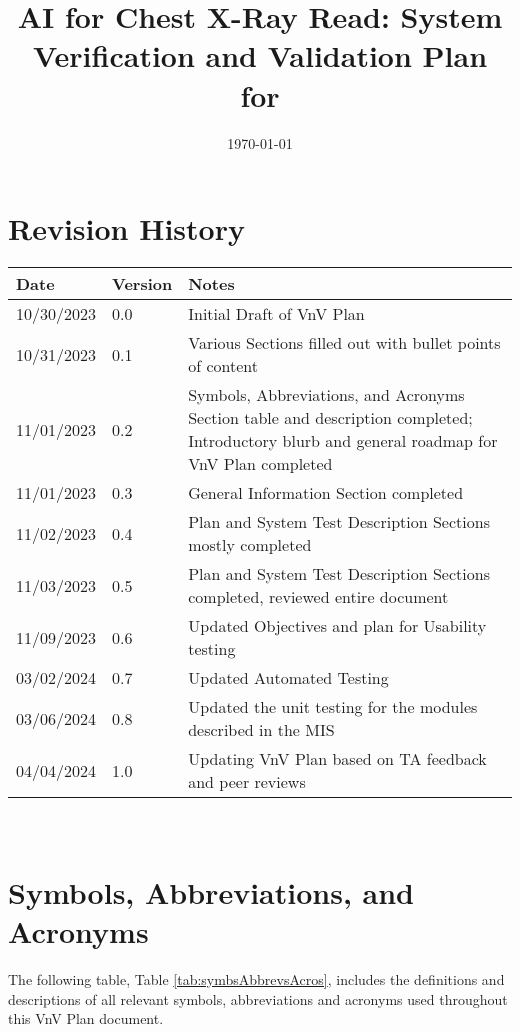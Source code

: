 \documentclass[12pt, titlepage]{article}
\begin{document}
\title{AI for Chest X-Ray Read: System Verification and Validation Plan for \progname}
\author{\authname}
\date{\today}
    
\maketitle


\section*{Revision History}

\begin{tabularx}{\textwidth}{p{3cm}p{2cm}X}
    \toprule {\bf Date} & {\bf Version} & {\bf Notes}\\
    \midrule
    10/30/2023 & 0.0 & Initial Draft of VnV Plan\\
    10/31/2023 & 0.1 & Various Sections filled out with bullet points of content\\
    11/01/2023 & 0.2 & Symbols, Abbreviations, and Acronyms Section table and description completed; Introductory blurb and general roadmap for VnV Plan completed\\
    11/01/2023 & 0.3 & General Information Section completed\\
    11/02/2023 & 0.4 & Plan and System Test Description Sections mostly completed\\
    11/03/2023 & 0.5 & Plan and System Test Description Sections completed, reviewed entire document\\
    11/09/2023 & 0.6 & Updated Objectives and plan for Usability testing\\
    03/02/2024 & 0.7 & Updated Automated Testing \\
    03/06/2024 & 0.8 & Updated the unit testing for the modules described in the MIS \\
    04/04/2024 & 1.0 & Updating VnV Plan based on TA feedback and peer reviews\\
    \bottomrule
\end{tabularx}

~\\

\newpage

\tableofcontents

\listoftables

\listoffigures

\newpage

\section{Symbols, Abbreviations, and Acronyms}
The following table, Table \ref{tab:symbsAbbrevsAcros}, includes the definitions and descriptions of all relevant symbols, abbreviations and acronyms used throughout this VnV Plan document.
\end{document}
